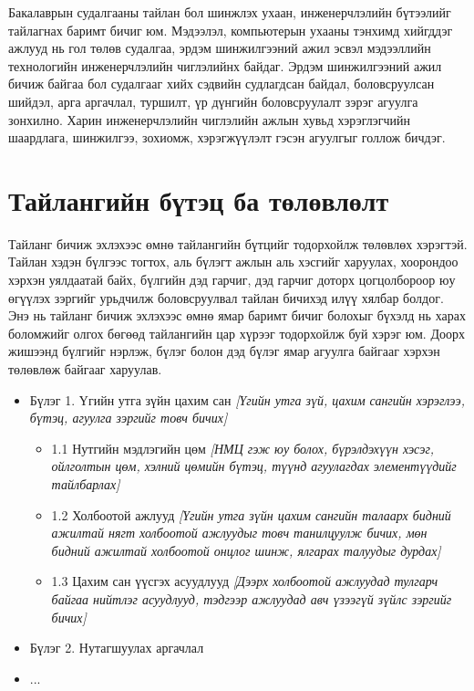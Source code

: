 Бакалаврын судалгааны тайлан бол шинжлэх ухаан, инженерчлэлийн бүтээлийг тайлагнах баримт бичиг юм. Мэдээлэл, компьютерын ухааны тэнхимд хийгддэг ажлууд нь гол төлөв судалгаа, эрдэм шинжилгээний ажил эсвэл мэдээллийн технологийн инженерчлэлийн чиглэлийнх байдаг. Эрдэм шинжилгээний ажил бичиж байгаа бол судалгааг хийх сэдвийн судлагдсан байдал, боловсруулсан шийдэл, арга аргачлал, туршилт, үр дүнгийн боловсруулалт зэрэг агуулга зонхилно. Харин инженерчлэлийн чиглэлийн ажлын хувьд хэрэглэгчийн шаардлага, шинжилгээ, зохиомж, хэрэгжүүлэлт гэсэн агуулгыг голлож бичдэг.

\section{Тайлангийн бүтэц ба төлөвлөлт}
Тайланг бичиж эхлэхээс өмнө тайлангийн бүтцийг тодорхойлж төлөвлөх хэрэгтэй. Тайлан хэдэн бүлгээс тогтох, аль бүлэгт ажлын аль хэсгийг харуулах, хоорондоо хэрхэн уялдаатай байх, бүлгийн дэд гарчиг, дэд гарчиг доторх цогцолбороор юу өгүүлэх зэргийг урьдчилж боловсруулвал тайлан бичихэд илүү хялбар болдог. Энэ нь тайланг бичиж эхлэхээс өмнө ямар баримт бичиг болохыг бүхэлд нь харах боломжийг олгох бөгөөд тайлангийн цар хүрээг тодорхойлж буй хэрэг юм. Доорх жишээнд бүлгийг нэрлэж, бүлэг болон дэд бүлэг ямар агуулга байгааг хэрхэн төлөвлөж байгааг харуулав.

\begin{itemize}
	\item Бүлэг 1. Үгийн утга зүйн цахим сан
	\textit{[Үгийн утга зүй, цахим сангийн хэрэглээ, бүтэц, агуулга зэргийг товч бичих]}
	\begin{itemize}
	    \item 1.1 Нутгийн мэдлэгийн цөм \textit{[НМЦ гэж юу болох, бүрэлдэхүүн хэсэг, ойлголтын цөм, хэлний цөмийн бүтэц, түүнд агуулагдах элементүүдийг тайлбарлах]}
	    \item 1.2 Холбоотой ажлууд \textit{[Үгийн утга зүйн цахим сангийн талаарх бидний ажилтай нягт холбоотой ажлуудыг товч танилцуулж бичих, мөн бидний ажилтай холбоотой онцлог шинж, ялгарах талуудыг дурдах]}
	    \item 1.3 Цахим сан үүсгэх асуудлууд \textit{[Дээрх холбоотой ажлуудад тулгарч байгаа нийтлэг асуудлууд, тэдгээр ажлуудад авч үзээгүй зүйлс зэргийг бичих]}
	\end{itemize}
	\item Бүлэг 2. Нутагшуулах аргачлал
	\item ...
\end{itemize}

